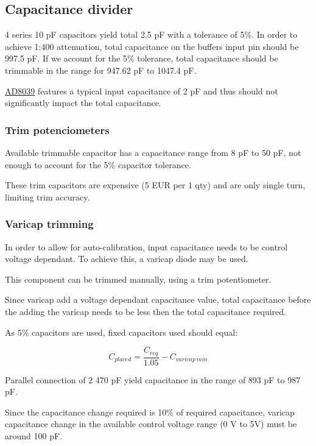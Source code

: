 \documentclass[11pt]{article}
\begin{document}
\subsection{Capacitance divider}
4 series 10 \si{\pico \farad } capacitors yield total 2.5 \si{\pico \farad } with a 
tolerance of 5\%. In order to achieve 1:400 attenuation, total capacitance on the 
buffers input pin should be 997.5 pF. If we account for the 5\% tolerance, 
total capacitance should be trimmable in the range for 947.62 pF to 1047.4 pF.

\href{https://www.analog.com/media/en/technical-documentation/data-sheets/AD8038_8039.pdf}{AD8039}
features a typical input capacitance of 2 pF and thus should not significantly 
impact the total capacitance.


\subsubsection{Trim potenciometers}
Available trimmable capacitor has a capacitance range from 8 pF to 50 pF, not 
enough to account for the 5\% capacitor tolerance.

These trim capacitors are expensive (5 EUR per 1 qty) and are only single turn,
limiting trim accuracy. 


\subsubsection{Varicap trimming}
In order to allow for auto-calibration, input capacitance needs to be control
voltage dependant. To achieve this, a varicap diode may be used.

This component can be trimmed manually, using a trim potentiometer.

Since varicap add a voltage dependant capacitance value, total capacitance before
the adding the varicap needs to be less then the total capacitance required. 

As 5\% capacitors are used, fixed capacitors used should equal:

\begin{equation}
  C_{placed} = \frac{C_{req}}{1.05} - C_{varicap\ min}
  \label{eq:}
\end{equation}

Parallel connection of 2 470 pF yield capacitance in the range of 893 pF to 987 pF.

Since the capacitance change required is 10\% of required capacitance, varicap 
capacitance change in the available control voltage range (0 V to 5V) must be around
100 pF.\\
\end{document}
